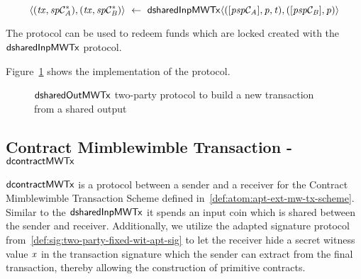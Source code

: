\[ \langle (\mathit{tx}, \mathit{sp}\mathcal{C}_{\mathit{A}}^*), (\mathit{tx}, \mathit{sp}\mathcal{C}_{\mathit{B}}^*) \rangle ~\leftarrow~ \mathsf{dsharedInpMWTx} \langle([\mathit{psp}\mathcal{C}_{\mathit{A}}],\mathit{p},\mathit{t}), ([\mathit{psp}\mathcal{C}_{\mathit{B}}],\mathit{p}) \rangle \]

The protocol can be used to redeem funds which are locked created with the $\mathsf{dsharedInpMWTx}$ protocol.

Figure~\ref{fig:d-shared-inp-mw-tx} shows the implementation of the protocol.

\begin{figure}
    \caption{$\mathsf{dsharedOutMWTx}$ two-party protocol to build a new transaction from a shared output} \label{fig:d-shared-inp-mw-tx}
\end{figure}

\subsection{Contract Mimblewimble Transaction - $\mathsf{dcontractMWTx}$} \label{subsec:atom:script-mw-tx}

$\mathsf{dcontractMWTx}$ is a protocol between a sender and a receiver for the Contract Mimblewimble Transaction Scheme defined in~\ref{def:atom:apt-ext-mw-tx-scheme}.
Similar to the $\mathsf{dsharedInpMWTx}$ it spends an input coin which is shared between the sender and receiver.
Additionally, we utilize the adapted signature protocol from~\ref{def:sig:two-party-fixed-wit-apt-sig} to let the receiver hide a secret witness value $\mathit{x}$ in the transaction signature which the sender can extract from the final transaction, thereby allowing the construction of primitive contracts.

